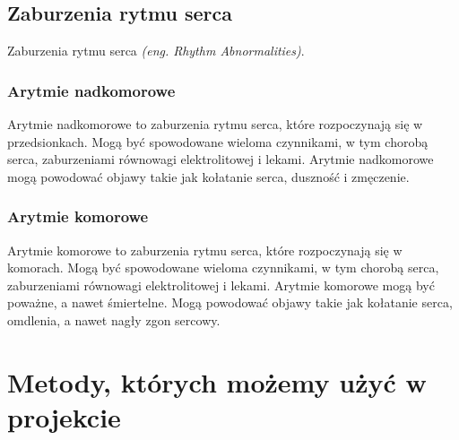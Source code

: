 \documentclass[12pt,a4paper]{article}
\begin{document}
\subsection{Zaburzenia rytmu serca}
Zaburzenia rytmu serca \textit{(eng. Rhythm Abnormalities)}.

\subsubsection{Arytmie nadkomorowe} 
Arytmie nadkomorowe to zaburzenia rytmu serca, które rozpoczynają się w przedsionkach. Mogą być spowodowane wieloma czynnikami, w tym chorobą serca, zaburzeniami równowagi elektrolitowej i lekami. Arytmie nadkomorowe mogą powodować objawy takie jak kołatanie serca, duszność i zmęczenie.

\subsubsection{Arytmie komorowe} 
Arytmie komorowe to zaburzenia rytmu serca, które rozpoczynają się w komorach. Mogą być spowodowane wieloma czynnikami, w tym chorobą serca, zaburzeniami równowagi elektrolitowej i lekami. Arytmie komorowe mogą być poważne, a nawet śmiertelne. Mogą powodować objawy takie jak kołatanie serca, omdlenia, a nawet nagły zgon sercowy.


\section{Metody, których możemy użyć w projekcie}


\end{document}
